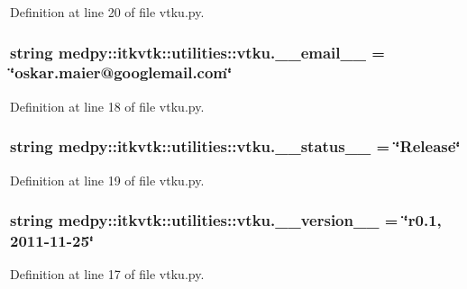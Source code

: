 Definition at line 20 of file vtku.py.

\hypertarget{namespacemedpy_1_1itkvtk_1_1utilities_1_1vtku_ab879e23dfd8f5e9972ce9cc5f51b904a}{
\subsubsection[{\_\-\_\-email\_\-\_\-}]{\setlength{\rightskip}{0pt plus 5cm}string {\bf medpy::itkvtk::utilities::vtku.\_\-\_\-email\_\-\_\-} = \char`\"{}oskar.maier@googlemail.com\char`\"{}}}
\label{namespacemedpy_1_1itkvtk_1_1utilities_1_1vtku_ab879e23dfd8f5e9972ce9cc5f51b904a}


Definition at line 18 of file vtku.py.

\hypertarget{namespacemedpy_1_1itkvtk_1_1utilities_1_1vtku_a543191faf2390964a6904812b265b1c7}{
\subsubsection[{\_\-\_\-status\_\-\_\-}]{\setlength{\rightskip}{0pt plus 5cm}string {\bf medpy::itkvtk::utilities::vtku.\_\-\_\-status\_\-\_\-} = \char`\"{}Release\char`\"{}}}
\label{namespacemedpy_1_1itkvtk_1_1utilities_1_1vtku_a543191faf2390964a6904812b265b1c7}


Definition at line 19 of file vtku.py.

\hypertarget{namespacemedpy_1_1itkvtk_1_1utilities_1_1vtku_a20663e6d428a72a84a08920eb1db5b5c}{
\subsubsection[{\_\-\_\-version\_\-\_\-}]{\setlength{\rightskip}{0pt plus 5cm}string {\bf medpy::itkvtk::utilities::vtku.\_\-\_\-version\_\-\_\-} = \char`\"{}r0.1, 2011-\/11-\/25\char`\"{}}}
\label{namespacemedpy_1_1itkvtk_1_1utilities_1_1vtku_a20663e6d428a72a84a08920eb1db5b5c}


Definition at line 17 of file vtku.py.

